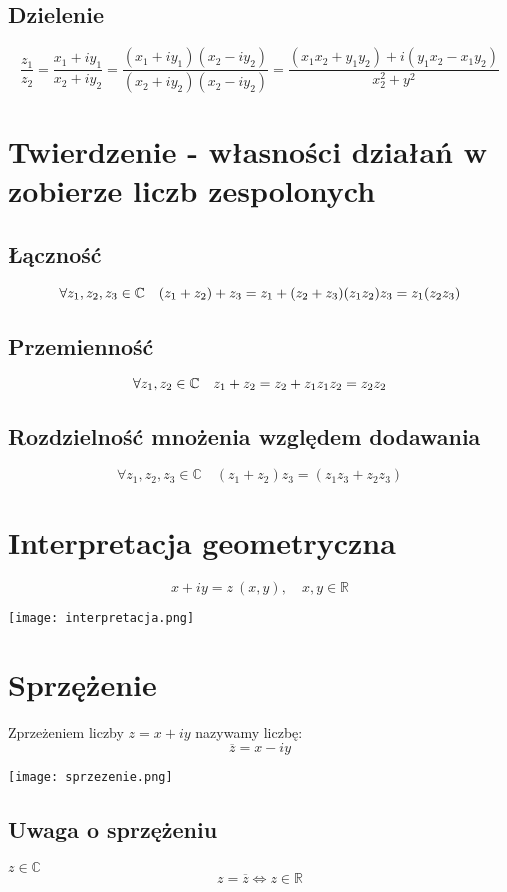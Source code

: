 \documentclass[11pt]{article}
\begin{document}
\subsection{Dzielenie}
$$\frac{z_1}{z_2} = \frac{x_1 +iy_1}{x_2 + iy_2} = \frac{(x_1 + iy_1)(x_2 - iy_2)}{(x_2 +iy_2)(x_2 - iy_2)} = \frac{(x_1x_2 + y_1y_2) + i(y_1x_2 - x_1y_2)}{x_2^2 +y^2} $$
\section{Twierdzenie - własności działań w zobierze liczb zespolonych}
\subsection{Łączność}
$$ \forall z_1,z_2,z_3 \in \mathbb{C} \quad (z_1 + z_2) + z_3 = z_1 + (z_2 + z_3)\\
(z_1z_2)z_3 = z_1(z_2z_3)$$
\subsection{Przemienność}
$$\forall z_1,z_2 \in \mathbb{C} \quad z_1 + z_2 = z_2 + z_1 \\
z_1z_2 = z_2z_2$$
\subsection{Rozdzielność mnożenia względem dodawania}
$$\forall z_1,z_2,z_3 \in \mathbb{C} \quad (z_1 + z_2) z_3 = (z_1z_3 + z_2z_3)$$

\section{Interpretacja geometryczna}
$$x + iy = z ~ (x,y) , \quad x,y \in \mathbb{R}$$
\begin{center}
\texttt{[image: interpretacja.png]}
\end{center}
\section{Sprzężenie}
Zprzeżeniem liczby $z = x + iy $ nazywamy liczbę:
$$\overline{z} = x - iy$$
\begin{center}
\texttt{[image: sprzezenie.png]}
\end{center}

\subsection{Uwaga o sprzężeniu}
$z \in \mathbb{C}$
$$ z = \overline{z} \iff z \in \mathbb{R}$$
\end{document}
